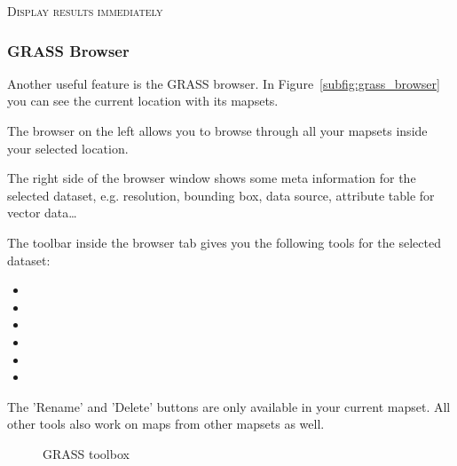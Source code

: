\begin{Tip}\caption{\textsc{Display results immediately}}
\end{Tip} 


\subsubsection{GRASS Browser} 

Another useful feature is the GRASS browser. In Figure~\ref{subfig:grass_browser}
you can see the current location with its mapsets. 

The browser on the left allows you to browse through all your mapsets inside your selected
location. 

The right side of the browser window shows some meta information for the selected dataset, e.g. resolution,
bounding box, data source, attribute table for vector data\dots

The toolbar inside the browser tab gives you the following tools for the selected dataset:
\begin{itemize}
\item {}
\item {}
\item {}
\item {}
\item {}
\item {}
\end{itemize}

The 'Rename' and 'Delete' buttons are only available in your current mapset. All other tools also work on
maps from other mapsets as well.

\begin{figure}[h]
\centering
	\caption{GRASS toolbox}
   \goodgap
\end{figure}

